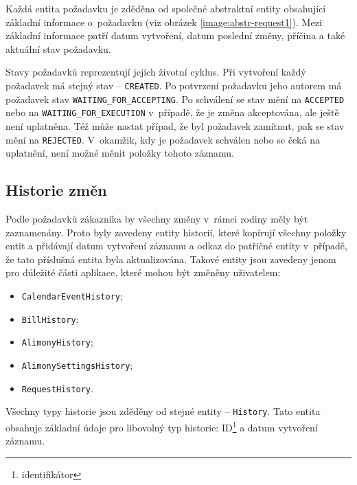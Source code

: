         Každá entita požadavku je zděděna od společné abstraktní entity obsahující základní informace o~požadavku (viz obrázek \ref{image:abstr-request1}). Mezi základní informace patří datum vytvoření, datum poslední změny, příčina a také aktuální stav požadavku.
        
        Stavy požadavků reprezentují jejích životní cyklus. Při vytvoření každý požadavek má stejný stav -- \verb|CREATED|. Po potvrzení požadavku jeho autorem má požadavek stav \verb|WAITING_FOR_ACCEPTING|. Po schválení se stav mění na \verb|ACCEPTED| nebo na \verb|WAITING_FOR_EXECUTION| v~případě, že je změna akceptována, ale ještě není uplatněna. Též může nastat případ, že byl požadavek zamítnut, pak se stav mění na \verb|REJECTED|. V~okamžik, kdy je požadavek schválen nebo se čeká na uplatnění, není možné měnit položky tohoto záznamu.
    
    \subsection{Historie změn}
        Podle požadavků zákazníka by všechny změny v~rámci rodiny měly být zaznamenány. Proto byly zavedeny entity historií, které kopírují všechny položky entit a přidávají datum vytvoření záznamu a odkaz do patřičné entity v~případě, že tato příslušná entita byla aktualizována. Takové entity jsou zavedeny jenom pro důležité části aplikace, které mohou být změněny uživatelem:
        \begin{itemize}
            \setlength\itemsep{0.3em}
            \item \texttt{CalendarEventHistory};
            \item \texttt{BillHistory};
            \item \texttt{AlimonyHistory};
            \item \texttt{AlimonySettingsHistory};
            \item \texttt{RequestHistory}.
        \end{itemize}
        Všechny typy historie jsou zděděny od stejné entity -- \verb|History|. Tato entita obsahuje základní údaje pro libovolný typ historie: ID\footnote{identifikátor} a datum vytvoření záznamu. 
     
